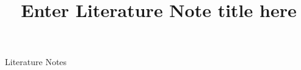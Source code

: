 \documentclass[a4paper,colorinlistoftodos]{article}
\title{Enter Literature Note title here}
\begin{document}
\maketitle

\begingroup
    \hypersetup{linkcolor=black}
    \tableofcontents
    \listoftodos
    \pagebreak
\endgroup

\linenumbers

\cite{shaya2012AstronomyOntology}

Literature Notes


\end{document}

